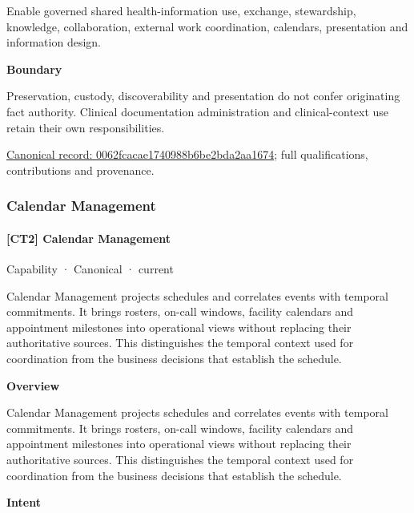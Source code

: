 Enable governed shared health-information use, exchange, stewardship, knowledge, collaboration, external work coordination, calendars, presentation and information design.



\textbf{Boundary}



Preservation, custody, discoverability and presentation do not confer originating fact authority. Clinical documentation administration and clinical-context use retain their own responsibilities.


{\footnotesize \href{../../../../continuum/strategy/capability/0062fcacae1740988b6be2bda2aa1674.md}{Canonical record: 0062fcacae1740988b6be2bda2aa1674}; full qualifications, contributions and provenance.}\par
\subsubsection{Calendar Management}

\paragraph{[CT2] Calendar Management}

\label{element:7669036f7e6749219412fc64df5f7064}
{\small Capability · Canonical · current}\par

Calendar Management projects schedules and correlates events with temporal commitments. It brings rosters, on-call windows, facility calendars and appointment milestones into operational views without replacing their authoritative sources. This distinguishes the temporal context used for coordination from the business decisions that establish the schedule.



\textbf{Overview}



Calendar Management projects schedules and correlates events with temporal commitments. It brings rosters, on-call windows, facility calendars and appointment milestones into operational views without replacing their authoritative sources. This distinguishes the temporal context used for coordination from the business decisions that establish the schedule.



\textbf{Intent}



